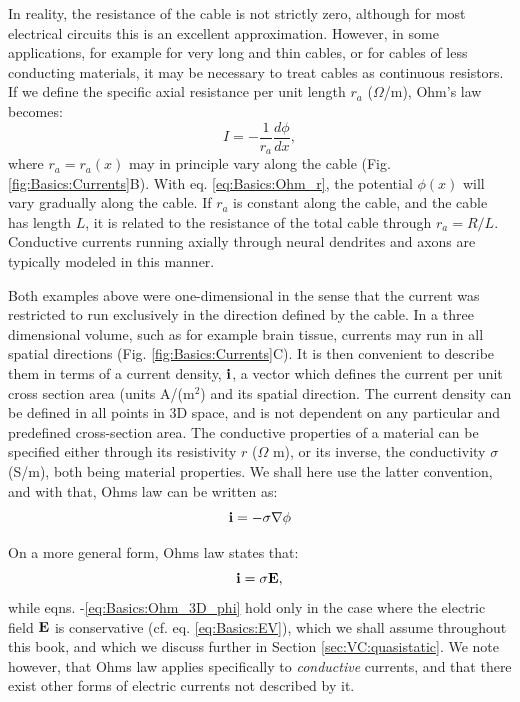 In reality, the resistance of the cable is not strictly zero, although for most electrical circuits this is an excellent approximation. However, in some applications, for example for very long and thin cables, or for cables of less conducting materials, it may be necessary to treat cables as continuous resistors. If we define the specific axial resistance per unit length $r_{a}$ ($\Omega$/m), Ohm's law becomes: 
\begin{equation}
I = - \frac{1}{r_a}\frac{d\phi}{dx}, 
\label{eq:Basics:Ohm_r}
\end{equation}
where $r_a=r_a(x)$ may in principle vary along the cable (Fig. \ref{fig:Basics:Currents}B). With eq. \ref{eq:Basics:Ohm_r}, the potential $\phi(x)$ will vary gradually along the cable. If $r_a$ is constant along the cable, and the cable has length $L$, it is related to the resistance of the total cable through $r_a=R/L$. Conductive currents running axially through neural dendrites and axons are typically modeled in this manner. 

Both examples above were one-dimensional in the sense that the current was restricted to run exclusively in the direction defined by the cable. In a three dimensional volume, such as for example brain tissue, currents may run in all spatial directions (Fig. \ref{fig:Basics:Currents}C). It is then convenient to describe them in terms of a current density, ${\bf i}$,  a vector which defines the current per unit cross section area (units A/(m$^2$) and its spatial direction. The current density can be defined in all points in 3D space, and is not dependent on any particular and predefined cross-section area. The conductive properties of a material can be specified either through its resistivity $r$ ($\Omega$ m), or its inverse, the conductivity $\sigma$ (S/m), both being material properties. We shall here use the latter convention, and with that, Ohms law can be written as:
\begin{equation}
{\bf i} = - \sigma \nabla \phi
\label{eq:Basics:Ohm_3D_phi}
\end{equation}

On a more general form, Ohms law states that:
\begin{equation}
{\bf i} = \sigma {\bf E}, 
\label{eq:Basics:Ohm_general}
\end{equation}
while eqns. \label{eq:Basics:Ohm_R}-\ref{eq:Basics:Ohm_3D_phi} hold only in the case where the electric field ${\bf E}$ is conservative (cf. eq. \ref{eq:Basics:EV}), which we shall assume throughout this book, and which we discuss further in Section \ref{sec:VC:quasistatic}. We note however, that Ohms law applies specifically to \textit{conductive} currents, and that there exist other forms of electric currents not described by it.


